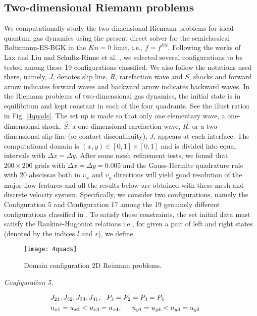 \documentclass{rsproca}%
\begin{document}
\subsection{Two-dimensional Riemann problems}
\label{Riemannp}
We computationally study the two-dimensional Riemann problems for ideal quantum gas dynamics using the present direct solver for the semiclassical Boltzmann-ES-BGK in the $Kn =0$ limit, i.e., $f=f^{ES}$.  Following the works of Lax and Liu \cite{Laxliu95} and Schultz-Rinne et al. \cite{schultzrinne}, we selected several configurations to be tested among those 19 configurations classified.  We also follow the notations used there, namely, $J$, denotes slip line, $R$, rarefaction wave and $S$, shocks and forward arrow indicates forward waves and backward arrow indicates backward waves. In the Riemann problems of two-dimensional gas dynamics, the initial state is in equilibrium and kept constant in each of the four quadrants. See the illust ration in Fig. \ref{4quads}. The set up is made so that only one elementary wave, a one-dimensional shock, $\vec{S}$, a one-dimensional rarefaction wave, $\vec{R}$, or a two-dimensional slip line (or contact discontinuity), $J$, appears at each interface.  The computational domain is $(x,y) \in [0,1]\times [0,1]$ and is divided into equal intervals with $\Delta x= \Delta y$.  After some mesh refinement tests, we found that $200\times 200$ grids with $\Delta x=\Delta y=0.005$ and the Gauss-Hermite quadrature rule with 20 abscissas both in $\upsilon_x$ and $\upsilon_y$ directions will yield good resolution of the major flow features and all the results below are obtained with these mesh and discrete velocity system.
Specifically, we consider two configurations, namely the Configuration 5 and Configuration 17 among the 19 genuinely different configurations classified in \cite{Laxliu95}\cite{schultzrinne}.    To satisfy these constraints, the set initial data must satisfy the Rankine-Hugoniot relations i.e., for given a pair of left and right states (denoted by the indices $l$ and $r$), we define \\

\begin{figure}
	\centering
	\texttt{[image: 4quads]}
  \caption{Domain configuration 2D Reimann problems.}
  \label{fig:4quads}
\end{figure}

{\em Configuration 5}.

\begin{eqnarray*}
&{J_{21}},J_{32},J_{34},{J_{41}},\hspace{0.1in}P_1=P_2=P_3=P_4&\\
&u_{x1}=u_{x2}<u_{x3}=u_{x4},\hspace{0.2in}u_{y1}=u_{y4}<u_{y3}=u_{y2}&
\label{con5setup}
\end{eqnarray*}
\end{document}
